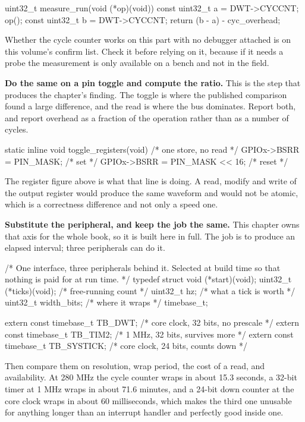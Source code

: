 \begin{steps}
\begin{ccode}
uint32_t measure_run(void (*op)(void))
{
    const uint32_t a = DWT->CYCCNT;
    op();
    const uint32_t b = DWT->CYCCNT;
    return (b - a) - cyc_overhead;
}
\end{ccode}
Whether the cycle counter works on this part with no debugger attached is on
this volume's confirm list. Check it before relying on it, because if it needs a
probe the measurement is only available on a bench and not in the field.

\item \textbf{Do the same on a pin toggle and compute the ratio.} This is the
step that produces the chapter's finding. The toggle is where the published
comparison found a large difference, and the read is where the bus dominates.
Report both, and report overhead as a fraction of the operation rather than as a
number of cycles.
\begin{ccode}
static inline void toggle_registers(void)   /* one store, no read */
{
    GPIOx->BSRR = PIN_MASK;                  /* set   */
    GPIOx->BSRR = PIN_MASK << 16;            /* reset */
}
\end{ccode}
The register figure above is what that line is doing. A read, modify and write
of the output register would produce the same waveform and would not be atomic,
which is a correctness difference and not only a speed one.

\item \textbf{Substitute the peripheral, and keep the job the same.} This
chapter owns that axis for the whole book, so it is built here in full. The job
is to produce an elapsed interval; three peripherals can do it.
\begin{ccode}
/* One interface, three peripherals behind it. Selected at build time so
   that nothing is paid for at run time. */
typedef struct {
    void     (*start)(void);
    uint32_t (*ticks)(void);     /* free-running count */
    uint32_t hz;                 /* what a tick is worth */
    uint32_t width_bits;         /* where it wraps */
} timebase_t;

extern const timebase_t TB_DWT;      /* core clock, 32 bits, no prescale  */
extern const timebase_t TB_TIM2;     /* 1 MHz, 32 bits, survives more     */
extern const timebase_t TB_SYSTICK;  /* core clock, 24 bits, counts down  */
\end{ccode}
Then compare them on resolution, wrap period, the cost of a read, and
availability. At 280 MHz the cycle counter wraps in about 15.3 seconds, a 32-bit
timer at 1 MHz wraps in about 71.6 minutes, and a 24-bit down counter at the
core clock wraps in about 60 milliseconds, which makes the third one unusable
for anything longer than an interrupt handler and perfectly good inside one.


\end{steps}
